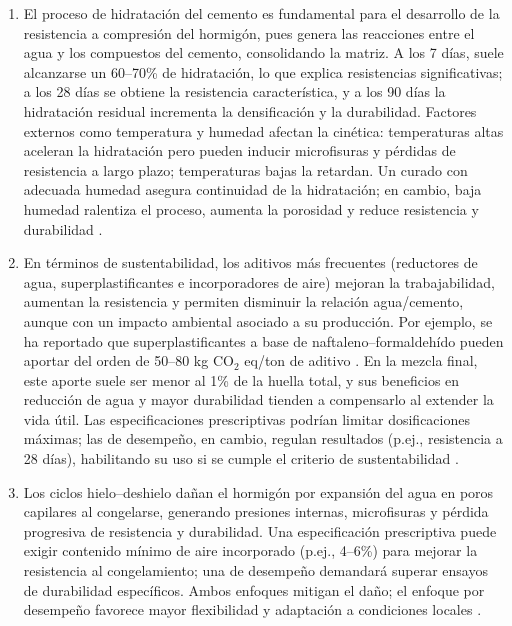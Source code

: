 \begin{enumerate}
    \item El proceso de hidratación del cemento es fundamental para el desarrollo de la resistencia a compresión del hormigón, pues genera las reacciones entre el agua y los compuestos del cemento, consolidando la matriz. A los 7 días, suele alcanzarse un 60--70\% de hidratación, lo que explica resistencias significativas; a los 28 días se obtiene la resistencia característica, y a los 90 días la hidratación residual incrementa la densificación y la durabilidad. Factores externos como temperatura y humedad afectan la cinética: temperaturas altas aceleran la hidratación pero pueden inducir microfisuras y pérdidas de resistencia a largo plazo; temperaturas bajas la retardan. Un curado con adecuada humedad asegura continuidad de la hidratación; en cambio, baja humedad ralentiza el proceso, aumenta la porosidad y reduce resistencia y durabilidad \citep{NCh170-2016}.
    
    \item En términos de sustentabilidad, los aditivos más frecuentes (reductores de agua, superplastificantes e incorporadores de aire) mejoran la trabajabilidad, aumentan la resistencia y permiten disminuir la relación agua/cemento, aunque con un impacto ambiental asociado a su producción. Por ejemplo, se ha reportado que superplastificantes a base de naftaleno–formaldehído pueden aportar del orden de 50--80 kg CO$_2$ eq/ton de aditivo \citep{Habert2011,Flower2007}. En la mezcla final, este aporte suele ser menor al 1\% de la huella total, y sus beneficios en reducción de agua y mayor durabilidad tienden a compensarlo al extender la vida útil. Las especificaciones prescriptivas podrían limitar dosificaciones máximas; las de desempeño, en cambio, regulan resultados (p.ej., resistencia a 28 días), habilitando su uso si se cumple el criterio de sustentabilidad \citep{NCh170-2016}.
    
    \item Los ciclos hielo–deshielo dañan el hormigón por expansión del agua en poros capilares al congelarse, generando presiones internas, microfisuras y pérdida progresiva de resistencia y durabilidad. Una especificación prescriptiva puede exigir contenido mínimo de aire incorporado (p.ej., 4--6\%) para mejorar la resistencia al congelamiento; una de desempeño demandará superar ensayos de durabilidad específicos. Ambos enfoques mitigan el daño; el enfoque por desempeño favorece mayor flexibilidad y adaptación a condiciones locales \citep{Powers1954,MehtaMonteiro2014}.
    

\end{enumerate}
